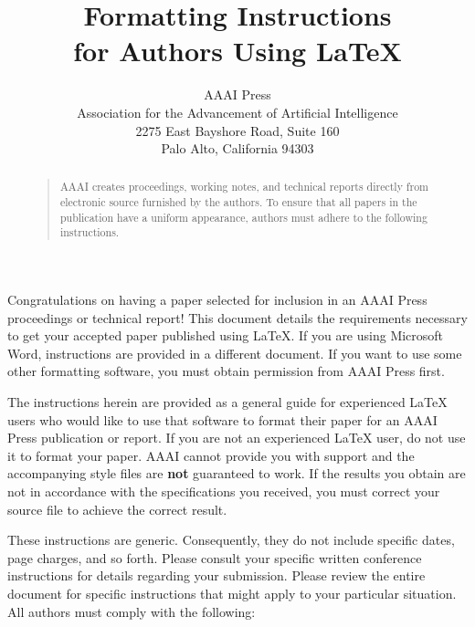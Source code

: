 \documentclass[letterpaper]{article}
\begin{document}
%
\title{Formatting Instructions \\for Authors Using \LaTeX{}}
\author{AAAI Press\\
Association for the Advancement of Artificial Intelligence\\
2275 East Bayshore Road, Suite 160\\
Palo Alto, California 94303\\
}
\maketitle
\begin{abstract}
\begin{quote}
AAAI creates proceedings, working notes, and technical reports directly from electronic source furnished by the authors. To ensure that all papers in the publication have a uniform appearance, authors must adhere to the following instructions. 
\end{quote}
\end{abstract}

\noindent Congratulations on having a paper selected for inclusion in an AAAI Press proceedings or technical report! This document details the requirements necessary to get your accepted paper published using \LaTeX{}. If you are using Microsoft Word, instructions are provided in a different document. If you want to use some other formatting software, you must obtain permission from AAAI Press first. 

The instructions herein are provided as a general guide for experienced \LaTeX{} users who would like to use that software to format their paper for an AAAI Press publication or report. If you are not an experienced \LaTeX{} user, do not use it to format your paper. AAAI cannot provide you with support and the accompanying style files are \textbf{not} guaranteed to work. If the results you obtain are not in accordance with the specifications you received, you must correct your source file to achieve the correct result. 

These instructions are generic. Consequently, they do not include specific dates, page charges, and so forth. Please consult your specific written conference instructions for details regarding your submission. Please review the entire document for specific instructions that might apply to your particular situation. All authors must comply with the following:
\end{document}
